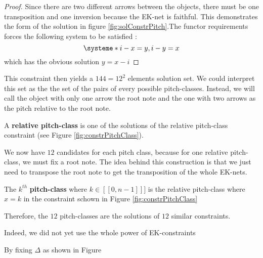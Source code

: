 \begin{proof}
    Since there are two different arrows between the objects, there must be one transposition and one inversion because the EK-net is faithful. This demonstrates the form of the solution in figure \ref{fig:solConstrPitch}.The functor requirements forces the following system to be satisfied : 
    $$\systeme*{i-x = y,i-y = x }$$
    which has the obvious solution $y = x - i$

\end{proof}

This constraint then yields a $144 = 12^2$ elements solution set. We could interpret this set as the the set of the pairs of every possible pitch-classes. Instead, we will call the object with only one arrow the root note and the one with two arrows as the pitch relative to the root note. 

\begin{defn}
    A \textbf{relative pitch-class} is one of the solutions of the relative pitch-class constraint (see Figure \ref{fig:constrPitchClass}).
\end{defn}


We now have $12$ candidates for each pitch class, because for one relative pitch-class, we must fix a root note. The idea behind this construction is that we just need to transpose the root note to get the transposition of the whole EK-nets.

\begin{defn}
    The $k^{th}$ \textbf{pitch-class} where $k\in[\![0,n-1]\!]]$ is the relative pitch-class where $x = k$ in the constraint schown in Figure \ref{fig:constrPitchClass}
\end{defn}

Therefore, the $12$ pitch-classes are the solutions of $12$ similar constraints.

Indeed, we did not yet use the whole power of EK-constraints




\begin{prop}
    By fixing $\Delta$ as shown in Figure%
\end{prop}

